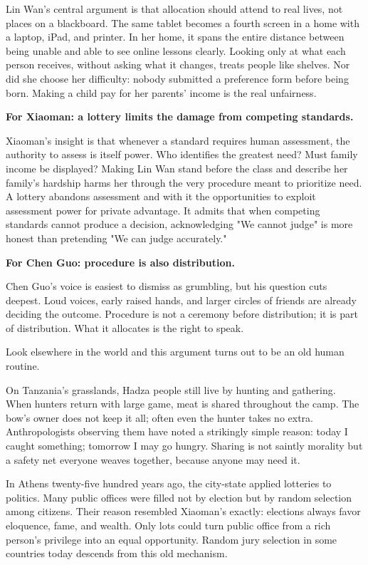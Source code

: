 Lin Wan's central argument is that allocation should attend to real lives, not places on a blackboard. The same tablet becomes a fourth screen in a home with a laptop, iPad, and printer. In her home, it spans the entire distance between being unable and able to see online lessons clearly. Looking only at what each person receives, without asking what it changes, treats people like shelves. Nor did she choose her difficulty: nobody submitted a preference form before being born. Making a child pay for her parents' income is the real unfairness.

\textbf{For Xiaoman: a lottery limits the damage from competing standards.}

Xiaoman's insight is that whenever a standard requires human assessment, the authority to assess is itself power. Who identifies the greatest need? Must family income be displayed? Making Lin Wan stand before the class and describe her family's hardship harms her through the very procedure meant to prioritize need. A lottery abandons assessment and with it the opportunities to exploit assessment power for private advantage. It admits that when competing standards cannot produce a decision, acknowledging "We cannot judge" is more honest than pretending "We can judge accurately."

\textbf{For Chen Guo: procedure is also distribution.}

Chen Guo's voice is easiest to dismiss as grumbling, but his question cuts deepest. Loud voices, early raised hands, and larger circles of friends are already deciding the outcome. Procedure is not a ceremony before distribution; it is part of distribution. What it allocates is the right to speak.

Look elsewhere in the world and this argument turns out to be an old human routine.

On Tanzania's grasslands, Hadza people still live by hunting and gathering. When hunters return with large game, meat is shared throughout the camp. The bow's owner does not keep it all; often even the hunter takes no extra. Anthropologists observing them have noted a strikingly simple reason: today I caught something; tomorrow I may go hungry. Sharing is not saintly morality but a safety net everyone weaves together, because anyone may need it.

In Athens twenty-five hundred years ago, the city-state applied lotteries to politics. Many public offices were filled not by election but by random selection among citizens. Their reason resembled Xiaoman's exactly: elections always favor eloquence, fame, and wealth. Only lots could turn public office from a rich person's privilege into an equal opportunity. Random jury selection in some countries today descends from this old mechanism.

